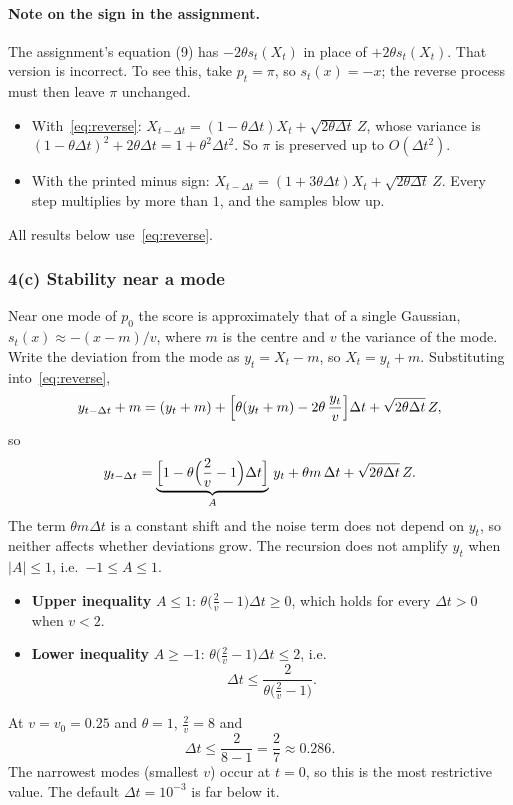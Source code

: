 \documentclass[11pt]{article}
\begin{document}
\paragraph{Note on the sign in the assignment.} The assignment's equation (9) has $-2\theta s_t(X_t)$ in place of
$+2\theta s_t(X_t)$. That version is incorrect. To see this, take $p_t=\pi$, so $s_t(x)=-x$; the reverse process must then
leave $\pi$ unchanged.
\begin{itemize}
\item With~\eqref{eq:reverse}: $X_{t-\Delta t} = (1-\theta\Delta t)X_t + \sqrt{2\theta\Delta t}\,Z$, whose variance is
$(1-\theta\Delta t)^2 + 2\theta\Delta t = 1 + \theta^2\Delta t^2$. So $\pi$ is preserved up to $O(\Delta t^2)$.
\item With the printed minus sign: $X_{t-\Delta t} = (1+3\theta\Delta t)X_t + \sqrt{2\theta\Delta t}\,Z$. Every step multiplies by
more than $1$, and the samples blow up.
\end{itemize}
All results below use~\eqref{eq:reverse}.

\subsubsection*{4(c) Stability near a mode}

Near one mode of $p_0$ the score is approximately that of a single Gaussian, $s_t(x)\approx-(x-m)/v$, where $m$ is the
centre and $v$ the variance of the mode. Write the deviation from the mode as $y_t = X_t - m$, so $X_t = y_t + m$.
Substituting into~\eqref{eq:reverse},
\[
y_{t-\Delta t} + m = (y_t+m) + \Bigl[\theta(y_t+m) - 2\theta\,\frac{y_t}{v}\Bigr]\Delta t + \sqrt{2\theta\Delta t}\,Z ,
\]
so
\[
y_{t-\Delta t} = \underbrace{\Bigl[1 - \theta\Bigl(\frac2v - 1\Bigr)\Delta t\Bigr]}_{A}\,y_t + \theta m\,\Delta t + \sqrt{2\theta\Delta t}\,Z .
\]
The term $\theta m\Delta t$ is a constant shift and the noise term does not depend on $y_t$, so neither affects whether
deviations grow. The recursion does not amplify $y_t$ when $|A|\le1$, i.e.\ $-1\le A\le1$.
\begin{itemize}
\item \textbf{Upper inequality} $A\le1$: $\theta\bigl(\frac2v-1\bigr)\Delta t\ge0$, which holds for every $\Delta t>0$ when $v<2$.
\item \textbf{Lower inequality} $A\ge-1$: $\theta\bigl(\frac2v-1\bigr)\Delta t\le2$, i.e.
\[
\boxed{\Delta t \le \frac{2}{\theta\bigl(\frac2v-1\bigr)}.}
\]
\end{itemize}
At $v=v_0=0.25$ and $\theta=1$, $\frac2v = 8$ and
\[
\Delta t \le \frac{2}{8-1} = \frac27 \approx 0.286 .
\]
The narrowest modes (smallest $v$) occur at $t=0$, so this is the most restrictive value. The default $\Delta t = 10^{-3}$
is far below it.
\end{document}
